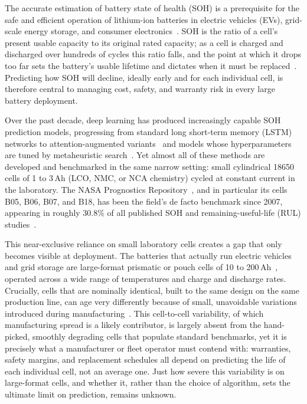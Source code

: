The accurate estimation of battery state of health (SOH) is a prerequisite
for the safe and efficient operation of lithium-ion batteries in electric
vehicles (EVs), grid-scale energy storage, and consumer
electronics~\cite{lipu2018review}.
SOH is the ratio of a cell's present usable capacity to its original rated
capacity; as a cell is charged and discharged over hundreds of cycles this
ratio falls, and the point at which it drops too far sets the battery's usable
lifetime and dictates when it must be replaced~\cite{birkl2017degradation}.
Predicting how SOH will decline, ideally early and for each individual cell, is
therefore central to managing cost, safety, and warranty risk in every large
battery deployment.

Over the past decade, deep learning has produced increasingly capable SOH
prediction models, progressing from standard long short-term memory (LSTM)
networks to attention-augmented variants~\cite{qu2019neural} and models whose
hyperparameters are tuned by metaheuristic
search~\cite{ponnambalam2024battery,ponnambalam2026delstm}.
Yet almost all of these methods are developed and benchmarked in the same
narrow setting: small cylindrical 18650 cells of 1 to 3\,Ah (LCO, NMC, or NCA
chemistry) cycled at constant current in the laboratory.
The NASA Prognostics Repository~\cite{saha2007battery}, and in particular its
cells B05, B06, B07, and B18, has been the field's de facto benchmark since
2007, appearing in roughly 30.8\% of all published SOH and remaining-useful-life
(RUL) studies~\cite{xu2025review,bairwa2025cycle}.

This near-exclusive reliance on small laboratory cells creates a gap that only
becomes visible at deployment.
The batteries that actually run electric vehicles and grid storage are
large-format prismatic or pouch cells of 10 to 200\,Ah~\cite{forgez2010thermal},
operated across a wide range of temperatures and charge and discharge rates.
Crucially, cells that are nominally identical, built to the same design on the
same production line, can age very differently because of small, unavoidable
variations introduced during manufacturing~\cite{birkl2017degradation}.
This cell-to-cell variability, of which manufacturing spread is a likely
contributor, is largely absent from the hand-picked, smoothly degrading cells
that populate standard benchmarks, yet it is precisely what a
manufacturer or fleet operator must contend with: warranties, safety margins,
and replacement schedules all depend on predicting the life of each individual
cell, not an average one.
Just how severe this variability is on large-format cells, and whether it,
rather than the choice of algorithm, sets the ultimate limit on prediction,
remains unknown.


